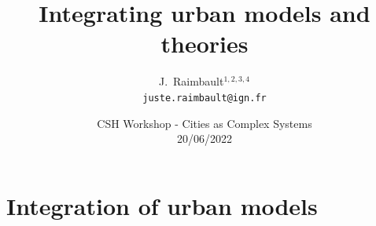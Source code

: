 \documentclass[english,11pt]{beamer}
\begin{document}
\title{Integrating urban models and theories}

\author{J.~Raimbault$^{1,2,3,4}$\\
\texttt{juste.raimbault@ign.fr}
}




\date{CSH Workshop - Cities as Complex Systems\\
20/06/2022
}




\frame{\maketitle}


\section{Integration of urban models}
\end{document}
